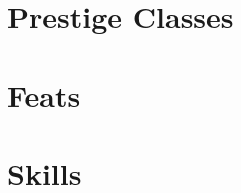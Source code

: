 \documentclass[10pt]{report}
\begin{document}
\section{Prestige Classes}

%

%






%



\section{Feats}
%

\section{Skills}

%

\end{document}
